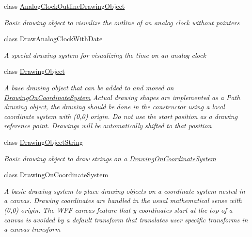 \begin{DoxyCompactItemize}
\item 
class \hyperlink{class_w_p_f_visualization_base_1_1_analog_clock_outline_drawing_object}{Analog\+Clock\+Outline\+Drawing\+Object}
\begin{DoxyCompactList}\small\item\em Basic drawing object to visualize the outline of an analog clock without pointers \end{DoxyCompactList}\item 
class \hyperlink{class_w_p_f_visualization_base_1_1_draw_analog_clock_with_date}{Draw\+Analog\+Clock\+With\+Date}
\begin{DoxyCompactList}\small\item\em A special drawing system for visualizing the time on an analog clock \end{DoxyCompactList}\item 
class \hyperlink{class_w_p_f_visualization_base_1_1_drawing_object}{Drawing\+Object}
\begin{DoxyCompactList}\small\item\em A base drawing object that can be added to and moved on \hyperlink{class_w_p_f_visualization_base_1_1_drawing_on_coordinate_system}{Drawing\+On\+Coordinate\+System} Actual drawing shapes are implemented as a Path drawing object, the drawing should be done in the constructor using a local coordinate system with (0,0) origin. Do not use the start position as a drawing reference point. Drawings will be automatically shifted to that position \end{DoxyCompactList}\item 
class \hyperlink{class_w_p_f_visualization_base_1_1_drawing_object_string}{Drawing\+Object\+String}
\begin{DoxyCompactList}\small\item\em Basic drawing object to draw strings on a \hyperlink{class_w_p_f_visualization_base_1_1_drawing_on_coordinate_system}{Drawing\+On\+Coordinate\+System} \end{DoxyCompactList}\item 
class \hyperlink{class_w_p_f_visualization_base_1_1_drawing_on_coordinate_system}{Drawing\+On\+Coordinate\+System}
\begin{DoxyCompactList}\small\item\em A basic drawing system to place drawing objects on a coordinate system nested in a canvas. Drawing coordinates are handled in the usual mathematical sense with (0,0) origin. The W\+PF canvas feature that y-\/coordinates start at the top of a canvas is avoided by a default transform that translates user specific transforms in a canvas transform \end{DoxyCompactList}\item 

\end{DoxyCompactItemize}
